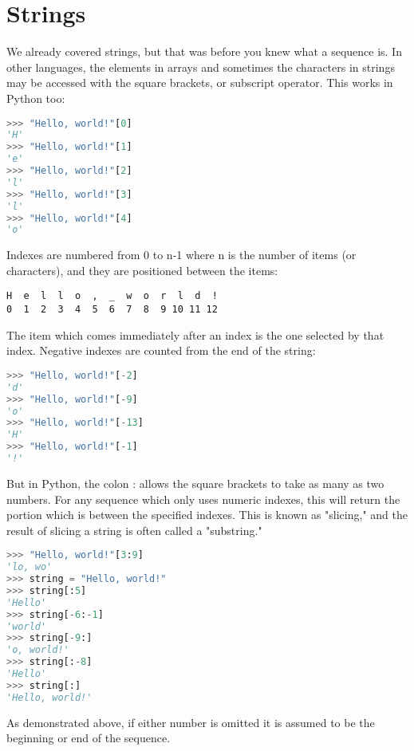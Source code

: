 \section{Strings}
We already covered strings, but that was before you knew what a sequence is. In
other languages, the elements in arrays and sometimes the characters in strings
may be accessed with the square brackets, or subscript operator. This works in
Python too:
\lstset{basicstyle=\scriptsize, numbers=left, captionpos=b, tabsize=4}
\begin{lstlisting}[caption=String Char Sequence 1,language={Python},
xleftmargin=15pt, label=lst:stringcharsequence1]
>>> "Hello, world!"[0]
'H'
>>> "Hello, world!"[1]
'e'
>>> "Hello, world!"[2]
'l'
>>> "Hello, world!"[3]
'l'
>>> "Hello, world!"[4]
'o'
\end{lstlisting}

Indexes are numbered from 0 to n-1 where n is the number of items (or
characters), and they are positioned between the items:
\scriptsize
\begin{verbatim}
H  e  l  l  o  ,  _  w  o  r  l  d  !
0  1  2  3  4  5  6  7  8  9 10 11 12
\end{verbatim}
\normalsize

The item which comes immediately after an index is the one selected by that
index. Negative indexes are counted from the end of the string:
\lstset{basicstyle=\scriptsize, numbers=left, captionpos=b, tabsize=4}
\begin{lstlisting}[caption=String Char Sequence 2,language={Python},
xleftmargin=15pt, label=lst:stringcharsequence2]
>>> "Hello, world!"[-2]
'd'
>>> "Hello, world!"[-9]
'o'
>>> "Hello, world!"[-13]
'H'
>>> "Hello, world!"[-1]
'!'
\end{lstlisting}

But in Python, the colon : allows the square brackets to take as many as two
numbers. For any sequence which only uses numeric indexes, this will return the
portion which is between the specified indexes. This is known as "slicing," and
the result of slicing a string is often called a "substring."
\lstset{basicstyle=\scriptsize, numbers=left, captionpos=b, tabsize=4}
\begin{lstlisting}[caption=Slice Operation 1,language={Python},
xleftmargin=15pt, label=lst:sliceoperation1]
>>> "Hello, world!"[3:9]
'lo, wo'
>>> string = "Hello, world!"
>>> string[:5]
'Hello'
>>> string[-6:-1]
'world'
>>> string[-9:]
'o, world!'
>>> string[:-8]
'Hello'
>>> string[:]
'Hello, world!'
\end{lstlisting}
As demonstrated above, if either number is omitted it is assumed to be the beginning or end of the sequence.

